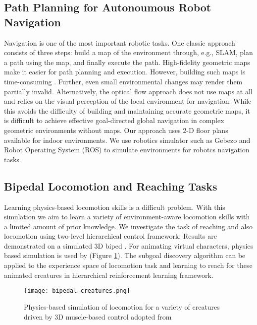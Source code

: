 \documentclass[letterpaper,titlepage]{article}
\begin{document}
\subsection{Path Planning for Autonoumous Robot Navigation}
Navigation is one of the most important robotic tasks. One classic approach consists of three steps: build a map of the environment through, e.g., SLAM, plan a path using the map, and finally execute the path. High-fidelity geometric maps make it easier for path planning and execution. However, building such maps is time-consuming \citep{ROBOT-NAVIGATION-Intention-Net:2017}. Further, even small environmental changes may render them partially invalid. Alternatively, the optical flow approach does not use maps at all and relies on the visual perception of the local environment for navigation. While this avoids the difficulty of building and maintaining accurate geometric maps, it is difficult to achieve effective goal-directed global navigation in complex geometric environments without maps. Our approach uses 2-D floor plans available for indoor environments. We use robotics simulator such as Gebezo and Robot Operating System (ROS) to simulate environments for robotcs navigation tasks. 

\subsection{Bipedal Locomotion and Reaching Tasks}
Learning physics-based locomotion skills is a difficult problem. With this simulation we aim to learn a variety of environment-aware locomotion skills with a limited amount of prior knowledge. We investigate the task of reaching and also locomotion using two-level hierarchical control framework. Results are demonstrated on a simulated 3D biped \citep{Deep-LOCO:Peng:2017,bipedal-creatures:Geijtenbeek:2013}.
For animating virtual characters, physics based simulation is used by \citep{bipedal-creatures:Geijtenbeek:2013} (Figure \ref{g:bipedal-creatures}). The subgoal discovery algorithm can be applied to the experience space of locomotion task and learning to reach for these animated creatures in hierarchical reinforcement learning framework.  
\begin{figure}[H]
\centering
\texttt{[image: bipedal-creatures.png]}
\caption{Physics-based simulation of locomotion for a variety of creatures driven by 3D muscle-based control adopted from \citep{bipedal-creatures:Geijtenbeek:2013}}
\label{g:bipedal-creatures}
\end{figure}
\end{document}

